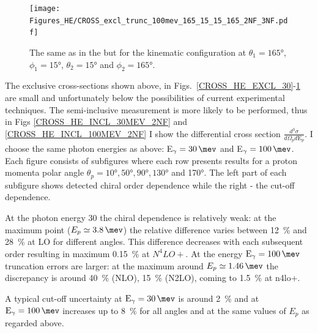         \begin{figure}[h]
            \begin{center}
                \texttt{[image: Figures\_HE/CROSS\_excl\_trunc\_100mev\_165\_15\_15\_165\_2NF\_3NF.pdf]}
                \end{center}
                \caption{The same as in the  but for the kinematic
                configuration at
                $\theta_1 = \ang{165}$, $\phi_1 = \ang{15}$,
                $\theta_2 = \ang{15}$ and $\phi_2 = \ang{165}$.}
                \label{CROSS_HE_EXCL_165_15_15_165}
        \end{figure}


        The exclusive cross-sections shown above, in Figs.~\ref{CROSS_HE_EXCL_30}-\ref{CROSS_HE_EXCL_165_15_15_165}
        are small and unfortunately below the possibilities of current 
        experimental techniques. The semi-inclusive measurement is more likely to be
        performed, thus in Figs \ref{CROSS_HE_INCL_30MEV_2NF} and \ref{CROSS_HE_INCL_100MEV_2NF}
        I show the 
        differential cross section $\frac{d^3\sigma}{d\Omega_p d\text{E}_p}$.
        I choose the same photon energies as above: E$_\gamma = \SI{30}{\mev}$ and
        E$_\gamma = \SI{100}{\mev}$.
        Each figure consists of subfigures where each row presents results
        for a proton momenta polar angle $\theta_p = \ang{10}, \ang{50}, \ang{90}, \ang{130}$ and \ang{170}.
        The left part of each subfigure shows detected
        chiral order dependence while the right - the cut-off dependence.
        
        At the photon energy \SI{30}{\mev} the chiral dependence is relatively weak: at the maximum point
        ($E_p \simeq \SI{3.8}{\mev}$) the relative difference varies between \SI{12}{\percent} and 
        \SI{28}{\percent} at LO for different angles. This difference decreases with each subsequent order
        resulting in maximum \SI{0.15}{\percent} at $N^4LO+$. At the energy $\text{E}_\gamma = \SI{100}{\mev}$ truncation errors
        are larger: at the maximum around $E_p \simeq \SI{1.46}{\mev}$ the discrepancy is around \SI{40}{\percent} (NLO),
        \SI{15}{\percent} (N2LO), coming to \SI{1.5}{\percent} at \gls{n4lo+}.

        A typical cut-off uncertainty at $\text{E}_\gamma = \SI{30}{\mev}$ is around \SI{2}{\percent}
        and at $\text{E}_\gamma = \SI{100}{\mev}$ increases up to \SI{8}{\percent} for all angles and 
        at the same values of $E_p$ as regarded above.

